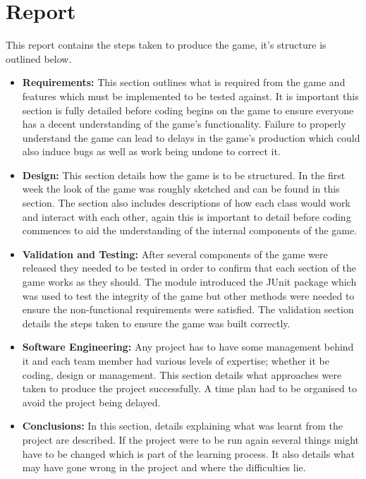 \section{Report}
This report contains the steps taken to produce the game, it's structure is outlined below.
\begin{itemize}
	\item \textbf{Requirements:} This section outlines what is required from the game and features which must be implemented to be tested against. It is important this section is fully detailed before coding begins on the game to ensure everyone has a decent understanding of the game's functionality. Failure to properly understand the game can lead to delays in the game's production which could also induce bugs as well as work being undone to correct it.
	\item \textbf{Design:} This section details how the game is to be structured. In the first week the look of the game was roughly sketched and can be found in this section. The section also includes descriptions of how each class would work and interact with each other, again this is important to detail before coding commences to aid the understanding of the internal components of the game.
	\item \textbf{Validation and Testing:} After several components of the game were released they needed to be tested in order to confirm that each section of the game works as they should. The module introduced the JUnit package which was used to test the integrity of the game but other methods were needed to ensure the non-functional requirements were satisfied. The validation section details the steps taken to ensure the game was built correctly.
	\item \textbf{Software Engineering:} Any project has to have some management behind it and each team member had various levels of expertise; whether it be coding, design or management. This section details what approaches were taken to produce the project successfully. A time plan had to be organised to avoid the project being delayed.
	\item \textbf{Conclusions:} In this section, details explaining what was learnt from the project are described. If the project were to be run again several things might have to be changed which is part of the learning process. It also details what may have gone wrong in the project and where the difficulties lie.
\end{itemize}